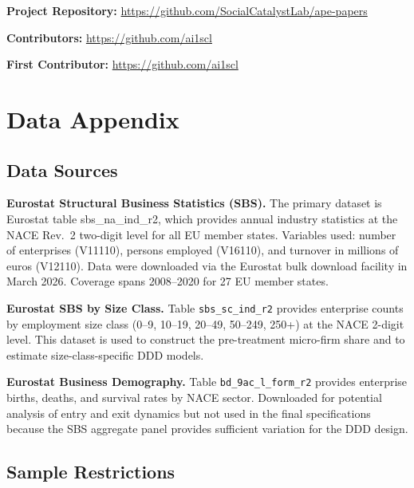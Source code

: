 \documentclass[12pt]{article}
\begin{document}
\noindent\textbf{Project Repository:} \url{https://github.com/SocialCatalystLab/ape-papers}

\noindent\textbf{Contributors:} \url{https://github.com/ai1scl}

\noindent\textbf{First Contributor:} \url{https://github.com/ai1scl}

\label{apep_main_text_end}
\newpage



\newpage
\appendix

\section{Data Appendix}
\label{sec:app_data}

\subsection{Data Sources}

\textbf{Eurostat Structural Business Statistics (SBS).} The primary dataset is Eurostat table sbs\_na\_ind\_r2, which provides annual industry statistics at the NACE Rev.~2 two-digit level for all EU member states. Variables used: number of enterprises (V11110), persons employed (V16110), and turnover in millions of euros (V12110). Data were downloaded via the Eurostat bulk download facility in March 2026. Coverage spans 2008--2020 for 27 EU member states.

\textbf{Eurostat SBS by Size Class.} Table \texttt{sbs\_sc\_ind\_r2} provides enterprise counts by employment size class (0--9, 10--19, 20--49, 50--249, 250+) at the NACE 2-digit level. This dataset is used to construct the pre-treatment micro-firm share and to estimate size-class-specific DDD models.

\textbf{Eurostat Business Demography.} Table \texttt{bd\_9ac\_l\_form\_r2} provides enterprise births, deaths, and survival rates by NACE sector. Downloaded for potential analysis of entry and exit dynamics but not used in the final specifications because the SBS aggregate panel provides sufficient variation for the DDD design.

\subsection{Sample Restrictions}
\end{document}
